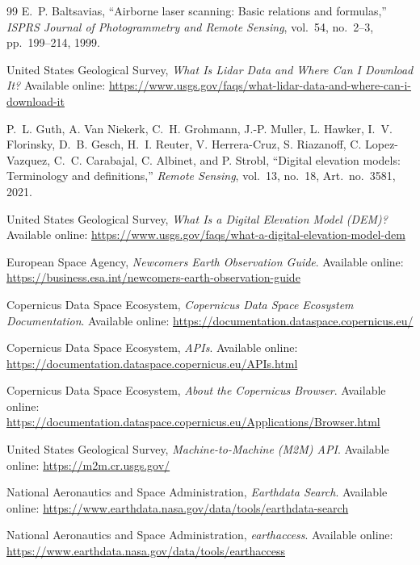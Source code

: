 \documentclass[11pt,a4paper]{article}
\begin{document}
\begin{thebibliography}{99}
E.~P. Baltsavias,
``Airborne laser scanning: Basic relations and formulas,''
\textit{ISPRS Journal of Photogrammetry and Remote Sensing},
vol.~54, no.~2--3, pp.~199--214, 1999.

United States Geological Survey,
\textit{What Is Lidar Data and Where Can I Download It?}
Available online:
\url{https://www.usgs.gov/faqs/what-lidar-data-and-where-can-i-download-it}

P.~L. Guth, A. Van Niekerk, C.~H. Grohmann, J.-P. Muller,
L. Hawker, I.~V. Florinsky, D.~B. Gesch, H.~I. Reuter,
V. Herrera-Cruz, S. Riazanoff, C. Lopez-Vazquez,
C.~C. Carabajal, C. Albinet, and P. Strobl,
``Digital elevation models: Terminology and definitions,''
\textit{Remote Sensing},
vol.~13, no.~18, Art.~no.~3581, 2021.

United States Geological Survey,
\textit{What Is a Digital Elevation Model (DEM)?}
Available online:
\url{https://www.usgs.gov/faqs/what-a-digital-elevation-model-dem}

European Space Agency,
\textit{Newcomers Earth Observation Guide}.
Available online:
\url{https://business.esa.int/newcomers-earth-observation-guide}


Copernicus Data Space Ecosystem,
\textit{Copernicus Data Space Ecosystem Documentation}.
Available online:
\url{https://documentation.dataspace.copernicus.eu/}

Copernicus Data Space Ecosystem,
\textit{APIs}.
Available online:
\url{https://documentation.dataspace.copernicus.eu/APIs.html}

Copernicus Data Space Ecosystem,
\textit{About the Copernicus Browser}.
Available online:
\url{https://documentation.dataspace.copernicus.eu/Applications/Browser.html}

United States Geological Survey,
\textit{Machine-to-Machine (M2M) API}.
Available online:
\url{https://m2m.cr.usgs.gov/}

National Aeronautics and Space Administration,
\textit{Earthdata Search}.
Available online:
\url{https://www.earthdata.nasa.gov/data/tools/earthdata-search}

National Aeronautics and Space Administration,
\textit{earthaccess}.
Available online:
\url{https://www.earthdata.nasa.gov/data/tools/earthaccess}


\end{thebibliography}
\end{document}
